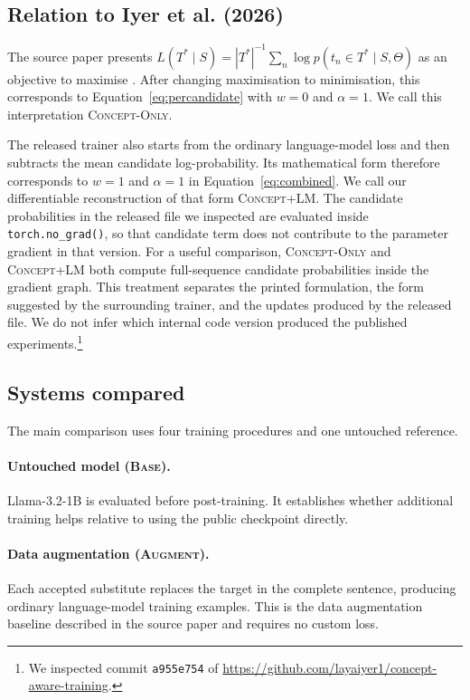 \documentclass[11pt]{article}
\newcommand{\base}{\textsc{Base}}
\newcommand{\aug}{\textsc{Augment}}
\newcommand{\peq}{\textsc{Concept-Only}}
\newcommand{\pcode}{\textsc{Concept+LM}}
\begin{document}
\subsection{Relation to Iyer et al. (2026)}

The source paper presents
$L(T^*\mid S)=|T^*|^{-1}\sum_n\log p(t_n\in T^*\mid S,\Theta)$ as an objective to
maximise \citep{iyer2026beyond}. After changing maximisation to minimisation,
this corresponds to Equation~\ref{eq:percandidate} with $w=0$ and $\alpha=1$.
We call this interpretation \peq{}.

The released trainer also starts from the ordinary language-model loss and then
subtracts the mean candidate log-probability. Its mathematical form therefore
corresponds to $w=1$ and $\alpha=1$ in Equation~\ref{eq:combined}. We call our
differentiable reconstruction of that form \pcode{}. The candidate probabilities
in the released file we inspected are evaluated inside
\texttt{torch.no\_grad()}, so that candidate term does not contribute to the
parameter gradient in that version. For a useful comparison, \peq{} and
\pcode{} both compute full-sequence candidate probabilities inside the gradient
graph. This treatment separates the printed formulation, the form suggested by
the surrounding trainer, and the updates produced by the released file. We do
not infer which internal code version produced the published experiments.\footnote{
We inspected commit \texttt{a955e754} of
\url{https://github.com/layaiyer1/concept-aware-training}.}

\subsection{Systems compared}

The main comparison uses four training procedures and one untouched reference.

\paragraph{Untouched model (\base{}).}
Llama-3.2-1B is evaluated before post-training. It establishes whether additional
training helps relative to using the public checkpoint directly.

\paragraph{Data augmentation (\aug{}).}
Each accepted substitute replaces the target in the complete sentence, producing
ordinary language-model training examples. This is the data augmentation
baseline described in the source paper and requires no custom loss.
\end{document}
